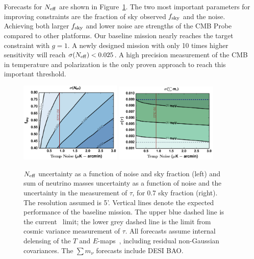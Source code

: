 Forecasts for ${N_{\rm eff}}$ are shown in Figure~\ref{fig:Neff_future}.  The two most important parameters for improving constraints
are the fraction of sky observed $f_{\rm sky}$ and the noise. Achieving both larger $f_{\rm sky}$ and
lower noise are strengths of the CMB Probe compared to other platforms. 
Our baseline mission nearly reaches the target constraint with $g=1$. 
A newly designed mission with only 10 times higher sensitivity will reach $\sigma({N_{\rm eff}}) < 0.025$.  A high precision measurement of the 
CMB in temperature and polarization is the only proven approach to reach this important threshold.  

\begin{figure}[t!]
\begin{center}
\includegraphics[width=0.45\textwidth]{figs/Neff.pdf}
\includegraphics[width=0.45\textwidth]{figs/Mnu_tauprior.pdf}
\vspace{-0.15in}
\caption{ \small \setlength{\baselineskip}{0.95\baselineskip}
${N_{\rm eff}}$ uncertainty as a function of noise and sky fraction (left) and sum of 
neutrino masses uncertainty as a function of noise and the uncertainty in the measurement of $\tau$, 
for 0.7 sky fraction (right). The resolution assumed is 5'.  
Vertical lines denote the expected performance of the baseline mission. 
The upper blue dashed line is the current \planck~limit; the lower grey dashed line is the limit from cosmic variance 
measurement of $\tau$. All forecasts assume internal delensing of the $T$ and $E$-maps~\cite{Green:2016cjr}, 
including residual non-Gaussian covariances.  The $\sum m_\nu$ forecasts include DESI BAO.  
\label{fig:Neff_future} }
\end{center}
\vspace{-0.15in}
\end{figure}

